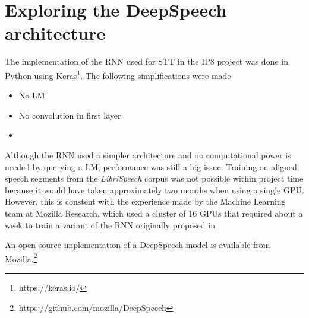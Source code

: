 \section{Exploring the DeepSpeech architecture}\label{ds}
The implementation of the RNN used for STT in the IP8 project was done in Python using Keras\footnote{https://keras.io/}. The following simplifications were made

\begin{itemize}
	\item No LM
	\item No convolution in first layer
	\item 
\end{itemize}

Although the RNN used a simpler architecture and no computational power is needed by querying a LM, performance was still a big issue. Training on aligned speech segments from the \textit{LibriSpeech} corpus was not possible within project time because it would have taken approximately two months when using a single GPU. However, this is constent with the experience made by the Machine Learning team at Mozilla Research, which used a cluster of 16 GPUs that required about a week \cite{mozillajourney} to train a variant of the RNN originally proposed in

An open source implementation of a DeepSpeech model is available from Mozilla.\footnote{https://github.com/mozilla/DeepSpeech}
